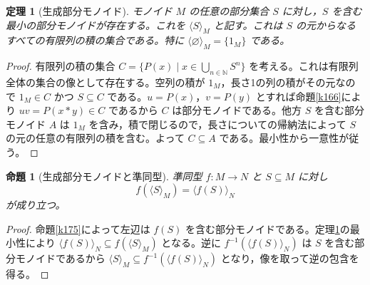 \documentclass[a5paper,10pt,dvipdfmx]{jsarticle}
\theoremstyle{definition}
\theoremstyle{plain}
\newtheorem{prop}[ruledef]{命題}
\newtheorem{thm}[ruledef]{定理}
\begin{document}
\begin{thm}[生成部分モノイド]\label{k176}
モノイド $M$ の任意の部分集合 $S$ に対し，$S$ を含む最小の部分モノイドが存在する。これを $\langle S\rangle_M$ と記す。これは $S$ の元からなるすべての有限列の積の集合である。特に $\langle\varnothing\rangle_M=\{1_M\}$ である。
\end{thm}
\begin{proof}
有限列の積の集合 $C=\{P(x)\mid x\in\bigcup_{n\in\mathbb N}S^n\}$ を考える。これは有限列全体の集合の像として存在する。空列の積が $1_M$，長さ1の列の積がその元なので $1_M\in C$ かつ $S\subseteq C$ である。$u=P(x)$，$v=P(y)$ とすれば命題\ref{k166}により $uv=P(x*y)\in C$ であるから $C$ は部分モノイドである。他方 $S$ を含む部分モノイド $A$ は $1_M$ を含み，積で閉じるので，長さについての帰納法によって $S$ の元の任意の有限列の積を含む。よって $C\subseteq A$ である。最小性から一意性が従う。
\end{proof}
\begin{prop}[生成部分モノイドと準同型]\label{k177}
準同型 $f\colon M\to N$ と $S\subseteq M$ に対し
\[f(\langle S\rangle_M)=\langle f(S)\rangle_N\]
が成り立つ。
\end{prop}
\begin{proof}
命題\ref{k175}によって左辺は $f(S)$ を含む部分モノイドである。定理\ref{k176}の最小性により $\langle f(S)\rangle_N\subseteq f(\langle S\rangle_M)$ となる。逆に $f^{-1}(\langle f(S)\rangle_N)$ は $S$ を含む部分モノイドであるから $\langle S\rangle_M\subseteq f^{-1}(\langle f(S)\rangle_N)$ となり，像を取って逆の包含を得る。
\end{proof}
\par\medskip{}
\end{document}
